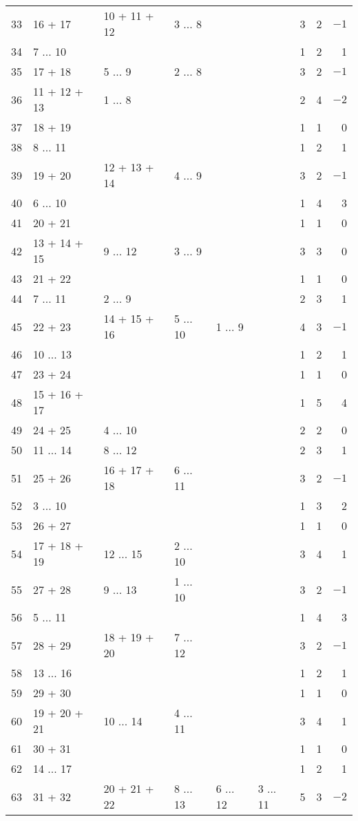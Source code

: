 \documentclass[12pt]{article}
\begin{document}
\begin{tabular}{|r|l|l|l|l|l|r|r|r|}
33 & 16 + 17 & 10 + 11 + 12 & 3 ... 8 & & & 3 & 2 & $-1$ \\
34 & 7 ... 10 & & & & & 1 & 2 & 1 \\
35 & 17 + 18 & 5 ... 9 & 2 ... 8 & & & 3 & 2 & $-1$ \\
36 & 11 + 12 + 13 & 1 ... 8 & & & & 2 & 4 & $-2$ \\
37 & 18 + 19 & & & & & 1 & 1 & 0 \\
38 & 8 ... 11 & & & & & 1 & 2 & 1 \\
39 & 19 + 20 & 12 + 13 + 14 & 4 ... 9 & & & 3 & 2 & $-1$ \\
40 & 6 ... 10 & & & & & 1 & 4 & 3 \\
41 & 20 + 21 & & & & & 1 & 1 & 0 \\
42 & 13 + 14 + 15 & 9 ... 12 & 3 ... 9 & & & 3 & 3 & 0 \\
43 & 21 + 22 & & & & & 1 & 1 & 0 \\
44 & 7 ... 11 & 2 ... 9 & & & & 2 & 3 & 1 \\
45 & 22 + 23 & 14 + 15 + 16 & 5 ... 10 & 1 ... 9 & & 4 & 3 & $-1$ \\
46 & 10 ... 13 & & & & & 1 & 2 & 1 \\
47 & 23 + 24 & & & & & 1 & 1 & 0 \\
48 & 15 + 16 + 17 & & & & & 1 & 5 & 4 \\
49 & 24 + 25 & 4 ... 10 & & & & 2 & 2 & 0 \\
50 & 11 ... 14 & 8 ... 12 & & & & 2 & 3 & 1 \\
51 & 25 + 26 & 16 + 17 + 18 & 6 ... 11 & & & 3 & 2 & $-1$ \\
52 & 3 ... 10 & & & & & 1 & 3 & 2 \\
53 & 26 + 27 & & & & & 1 & 1 & 0 \\
54 & 17 + 18 + 19 & 12 ... 15 & 2 ... 10 & & & 3 & 4 & 1 \\
55 & 27 + 28 & 9 ... 13 & 1 ... 10 & & & 3 & 2 & $-1$ \\
56 & 5 ... 11 & & & & & 1 & 4 & 3 \\
57 & 28 + 29 & 18 + 19 + 20 & 7 ... 12 & & & 3 & 2 & $-1$ \\
58 & 13 ... 16 & & & & & 1 & 2 & 1 \\
59 & 29 + 30 & & & & & 1 & 1 & 0 \\
60 & 19 + 20 + 21 & 10 ... 14 & 4 ... 11 & & & 3 & 4 & 1 \\
61 & 30 + 31 & & & & & 1 & 1 & 0 \\
62 & 14 ... 17 & & & & & 1 & 2 & 1 \\
63 & 31 + 32 & 20 + 21 + 22 & 8 ... 13 & 6 ... 12 & 3 ... 11 & 5 & 3 & $-2$ \\

\end{tabular}
\end{document}
